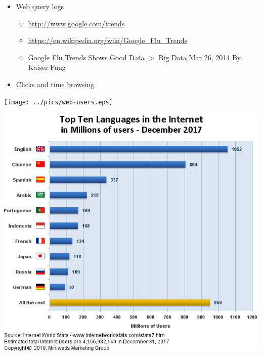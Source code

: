 \documentclass[a4paper,landscape,headrule,footrule,xetex]{foils}
\begin{document}

\begin{itemize}
\item Web query logs
  \begin{itemize}
  \item \url{http://www.google.com/trends}
  \item \url{https://en.wikipedia.org/wiki/Google_Flu_Trends}
  \item
    \href{https://thehealthcareblog.com/blog/2014/03/26/google-flu-trends-shows-good-data-big-data/}{Google
      Flu Trends Shows Good Data $>$ Big Data} Mar 26, 2014 By Kaiser Fung
  \end{itemize}
\item Clicks and time browsing
\end{itemize}


\texttt{[image: ../pics/web-users.eps]}


\includegraphics[height=\textheight]{../pics/languages2017Q4.png}
\end{document}

